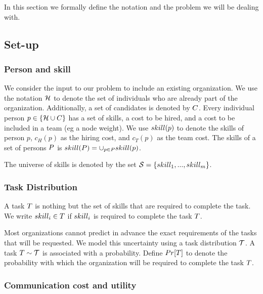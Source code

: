 In this section we formally define the notation and the problem we will be dealing with.
\subsection{Set-up}

\subsubsection{Person and skill}

We consider the input to our problem to include an existing organization.
We use the notation $\mathcal{H}$ to denote the set of individuals who are already part of the organization.
Additionally, a set of candidates is denoted by ${C}$.
Every individual person $p \in \{\mathcal{H} \cup {C}\}$ has a set of skills, a cost to be hired, and a cost to be included in a team (eg a node weight).
We use $skill(p)$ to denote the skills of person $p$, $c_H(p)$ as the hiring cost, and $c_T(p)$ as the team cost.
The skills of a set of persons $P$ is $skill(P) = \cup_{p \in P} skill(p)$.

The universe of skills is denoted by the set $\mathcal{S} = \{ skill_1, ..., skill_m \}$.

\subsubsection{Task Distribution}

A task $T$ is nothing but the set of skills that are required to complete the task.
We write $skill_i \in T$ if $skill_i$ is required to complete the task $T$.

Most organizations cannot predict in advance the exact requirements of the tasks that will be requested.
We model this uncertainty using a task distribution $\mathcal{T}$. 
A task $T \sim \mathcal{T}$ is associated with a probability.
Define $Pr[T]$ to denote the probability with which the organization will be required to complete the task $T$. 

\subsubsection{Communication cost and utility}

